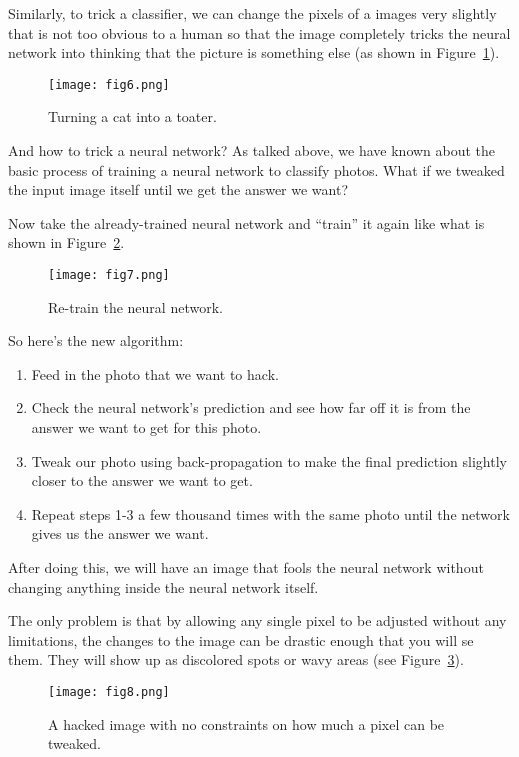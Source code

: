 \documentclass[10pt,twocolumn,letterpaper]{article}
\begin{document}
	Similarly, to trick a classifier, we can change the pixels of a images very slightly that is not too obvious to a human so that the image completely tricks the neural network into thinking that the picture is something else (as shown in Figure~\ref{fig6}).
	\begin{figure}[h]
		\centering
		\texttt{[image: fig6.png]}
		\caption{Turning a cat into a toater.} \label{fig6}
	\end{figure}
	\par
	And how to trick a neural network? As talked above, we have known about the basic process of training a neural network to classify photos. What if we tweaked the input image itself until we get the answer we want?
	\par
	Now take the already-trained neural network and ``train'' it again like what is shown in Figure~\ref{fig7}.
	\begin{figure}[h]
		\centering
		\texttt{[image: fig7.png]}
		\caption{Re-train the neural network.} \label{fig7}
	\end{figure}
	\par
	So here's the new algorithm:
	\begin{enumerate}
		\item Feed in the photo that we want to hack.
		\item Check the neural network's prediction and see how far off it is from the answer we want to get for this photo.
		\item Tweak our photo using back-propagation to make the final prediction slightly closer to the answer we want to get.
		\item Repeat steps 1-3 a few thousand times with the same photo until the network gives us the answer we want.
	\end{enumerate}
	\par
	After doing this, we will have an image that fools the neural network without changing anything inside the neural network itself.
	\par
	The only problem is that by allowing any single pixel to be adjusted without any limitations, the changes to the image can be drastic enough that you will se them. They will show up as discolored spots or wavy areas (see Figure~\ref{fig8}).
	\begin{figure}[h]
		\centering
		\texttt{[image: fig8.png]}
		\caption{A hacked image with no constraints on how much a pixel can be tweaked.} \label{fig8}
	\end{figure}
\end{document}
